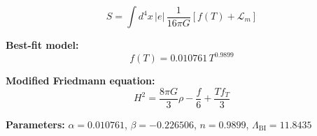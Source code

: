 
\begin{equation}
  S = \int d^4x \, |e| \, \frac{1}{16\pi G} \left[ f(T) + \mathcal{L}_m \right]
\end{equation}

\textbf{Best-fit model:}
\begin{equation}
  f(T) = 0.010761 \, T^{0.9899}
\end{equation}

\textbf{Modified Friedmann equation:}
\begin{equation}
  H^2 = \frac{8\pi G}{3} \rho - \frac{f}{6} + \frac{T f_T}{3}
\end{equation}

\textbf{Parameters:}
$\alpha = 0.010761$, \quad
$\beta = -0.226506$, \quad
$n = 0.9899$, \quad
$\Lambda_{\text{BI}} = 11.8435$